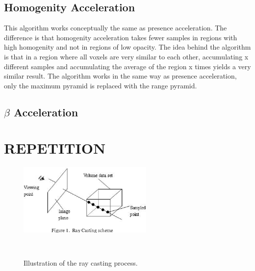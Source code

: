 {\subsection{Homogenity Acceleration}
This algorithm works conceptually the same as presence acceleration. The difference is that homogenity acceleration takes fewer samples in regions with high homogenity and not in regions of low opacity. The idea behind the algorithm is that in a region where all voxels are very similar to each other, accumulating x different samples and accumulating the average of the region x times yields a very similar result. The algorithm works in the same way as presence acceleration, only the maximum pyramid is replaced with the range pyramid.
\subsection{$\beta$  Acceleration}









\section{REPETITION}


\begin{figure}[htb]
  \centering
  \includegraphics[width=.8\linewidth]{RayCasting1.png}
  \parbox[t]{.9\columnwidth}{\relax}~\cite{Appa2015RayCF}
  \caption{\label{fig:firstExample}
          Illustration of the ray casting process.}
\end{figure}
}
